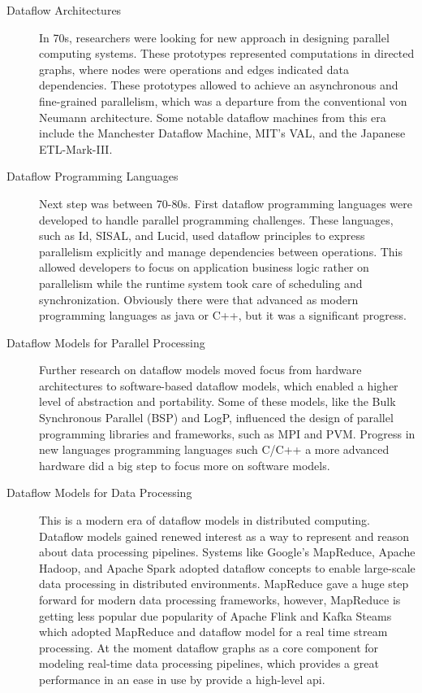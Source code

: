 \begin{description}
    \item[Dataflow Architectures] In 70s, researchers were looking for new approach in
    designing parallel computing systems.
    These prototypes represented computations in directed graphs,
    where nodes were operations and edges indicated data dependencies.
    These prototypes allowed to achieve an asynchronous and fine-grained parallelism,
    which was a departure from the conventional von Neumann architecture.
    Some notable dataflow machines from this era include the Manchester Dataflow Machine,
    MIT's VAL, and the Japanese ETL-Mark-III.
    \item[Dataflow Programming Languages] Next step was between 70-80s.
    First dataflow programming languages were developed to handle parallel programming challenges.
    These languages, such as Id, SISAL, and Lucid, used dataflow principles
    to express parallelism explicitly and manage dependencies between operations.
    This allowed developers to focus on application business logic rather on parallelism
    while the runtime system took care of scheduling and synchronization.
    Obviously there were that advanced as modern programming languages as java or C++, but it
    was a significant progress.
    \item[Dataflow Models for Parallel Processing] Further research on dataflow models moved
    focus from hardware architectures to software-based dataflow models,
    which enabled a higher level of abstraction and portability.
    Some of these models, like the Bulk Synchronous Parallel (BSP) and LogP,
    influenced the design of parallel programming libraries and frameworks, such as MPI and PVM.
    Progress in new languages programming languages such C/C++ a more advanced hardware did
    a big step to focus more on software models.
    \item[Dataflow Models for Data Processing] This is a modern era of dataflow models in distributed computing.
    Dataflow models gained renewed interest as a way to represent and reason about data processing pipelines.
    Systems like Google's MapReduce, Apache Hadoop, and Apache Spark adopted dataflow
    concepts to enable large-scale data processing in distributed environments.
    MapReduce gave a huge step forward for modern data processing frameworks, however,
    MapReduce is getting less popular due popularity of Apache Flink and Kafka Steams which
    adopted MapReduce and dataflow model for a real time stream processing.
    At the moment dataflow graphs as a core component for modeling real-time data processing pipelines,
    which provides a great performance in an ease in use by provide a high-level api.
\end{description}

